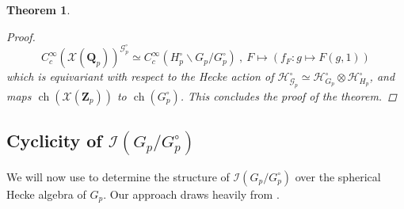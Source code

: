 \documentclass{amsart}%
\theoremstyle{plain}
\newtheorem{thm}{Theorem}[subsection]
\theoremstyle{plain}
\theoremstyle{remark}
\DeclareMathOperator{\ch}{ch}
\begin{document}
\begin{thm}
\begin{proof}
        $$C_c^\infty(\mathcal{X}(\mathbf{Q}_p))^{\mathscr{G}_p^\circ}\simeq C_c^\infty(H_p^\circ\backslash G_p/G_p^\circ)\ ,\ F\mapsto\left(f_F:g\mapsto F(g,1)\right)$$
        which is equivariant with respect to the Hecke action of $\mathcal{H}_{\mathscr{G}_p}^\circ\simeq \mathcal{H}_{G_p}^\circ\otimes \mathcal{H}_{H_p}^\circ$, and maps $\ch(\mathcal{X}(\mathbf{Z}_p))$ to $\ch(G_p^\circ)$. This concludes the proof of the theorem.
    \end{proof}
\end{thm}
\subsection{Cyclicity of $\mathcal{I}(G_p/G_p^\circ)$} We will now use  to determine the structure of $\mathcal{I}(G_p/G_p^\circ)$ over the spherical Hecke algebra of $G_p$. Our approach draws heavily from \cite[\S $4.3$]{Loeffler_2021}.  
\end{document}
